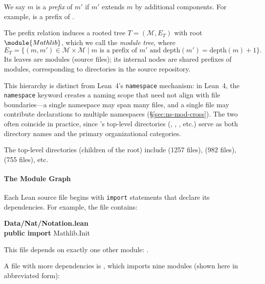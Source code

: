 We say $m$ is a \emph{prefix} of $m'$ if $m'$ extends $m$ by additional components. For example,  is a prefix of .

\begin{definition}\label{def:module-tree}
The prefix relation induces a rooted tree $T = (\mathcal{M}, E_T)$ with root $\module{Mathlib}$, which we call the \emph{module tree}, where
\[
  E_T = \{(m, m') \in \mathcal{M} \times \mathcal{M} \mid m \text{ is a prefix of } m' \text{ and } \mathrm{depth}(m') = \mathrm{depth}(m) + 1\}.
\]
Its leaves are modules (source files); its internal nodes are shared prefixes of modules, corresponding to directories in the source repository.
\end{definition} This hierarchy is distinct from Lean~4's \texttt{namespace} mechanism: in Lean~4, the \texttt{namespace} keyword creates a naming scope that need not align with file boundaries---a single namespace may span many files, and a single file may contribute declarations to multiple namespaces (\S\ref{sec:ns-mod-cross}). The two often coincide in practice, since 's top-level directories (, , , etc.) serve as both directory names and the primary organizational categories.

The top-level directories (children of the root) include  (1257 files),  (982 files),  (755 files), etc.

\paragraph{The Module Graph}
\label{sec:import-graph}

Each Lean source file begins with \texttt{import} statements that declare its dependencies. For example, the file  contains:

\begin{codebox}
\textsf{\bfseries\color{blue!60!black}Data/Nat/Notation.lean}\\[2pt]
\textbf{public import} \textcolor{blue!60!black}{Mathlib.Init}
\end{codebox}

\noindent
This file depends on exactly one other module: .

A file with more dependencies is , which imports nine modules (shown here in abbreviated form):

